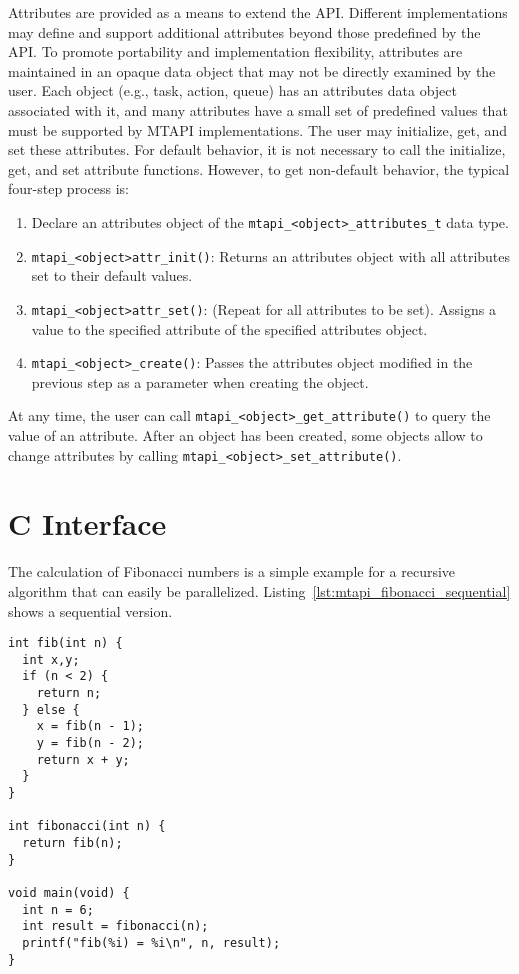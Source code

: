 Attributes are provided as a means to extend the API. Different implementations may define and support additional attributes beyond those predefined by the API. To promote portability and implementation flexibility, attributes are maintained in an opaque data object that may not be directly examined by the user. Each object (e.g., task, action, queue) has an attributes data object associated with it, and many attributes have a small set of predefined values that must be supported by MTAPI implementations. The user may initialize, get, and set these attributes. For default behavior, it is not necessary to call the initialize, get, and set attribute functions. However, to get non-default behavior, the typical four-step process is:
\begin{enumerate}
  \item Declare an attributes object of the \lstinline|mtapi_<object>_attributes_t| data type.
  \item \lstinline|mtapi_<object>attr_init()|: Returns an attributes object with all attributes set to their default values.
  \item \lstinline|mtapi_<object>attr_set()|: (Repeat for all attributes to be set). Assigns a value to the specified attribute of the specified attributes object.
  \item \lstinline|mtapi_<object>_create()|: Passes the attributes object modified in the previous step as a parameter when creating the object.
\end{enumerate}
At any time, the user can call \lstinline|mtapi_<object>_get_attribute()| to query the value of an attribute. After an object has been created, some objects allow to change attributes by calling \lstinline|mtapi_<object>_set_attribute()|.

\section{C Interface}
\label{sec:mtapi_c_interface}

The calculation of Fibonacci numbers is a simple example for a recursive algorithm that can easily be parallelized. Listing~\ref{lst:mtapi_fibonacci_sequential} shows a sequential version.

\begin{lstlisting}[frame=none,caption={Sequential program for computing Fibonacci numbers},label={lst:mtapi_fibonacci_sequential}]
int fib(int n) {
  int x,y;
  if (n < 2) {
    return n;
  } else {
    x = fib(n - 1);
    y = fib(n - 2);
    return x + y;
  }
}

int fibonacci(int n) {
  return fib(n);
}

void main(void) {
  int n = 6;
  int result = fibonacci(n);
  printf("fib(%i) = %i\n", n, result);
}
\end{lstlisting}

